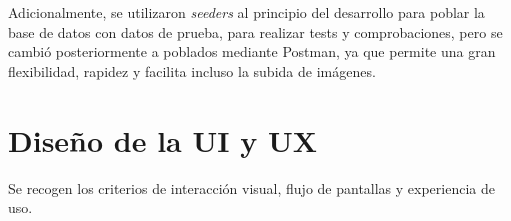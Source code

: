 Adicionalmente, se utilizaron \textit{seeders} al principio del desarrollo para poblar la base de datos con datos de prueba, para realizar tests y comprobaciones, 
pero se cambió posteriormente a poblados mediante Postman, ya que permite una gran flexibilidad, rapidez y facilita incluso la subida de imágenes.

\section{Diseño de la UI y UX}

Se recogen los criterios de interacción visual, flujo de pantallas y experiencia de uso.